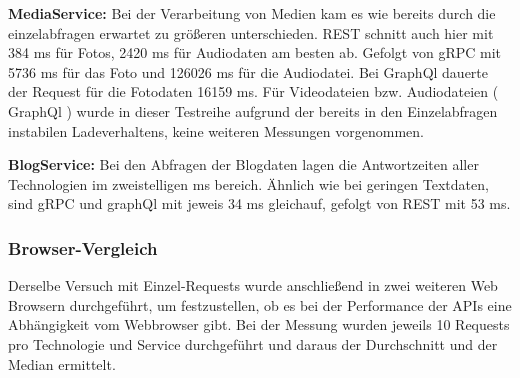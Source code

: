 \textbf{MediaService:}  
Bei der Verarbeitung von Medien kam es wie bereits durch die einzelabfragen erwartet zu größeren unterschieden. REST schnitt auch hier mit 384 ms für Fotos, 2420 ms für Audiodaten am besten ab. Gefolgt von gRPC mit 5736 ms für das Foto und 126026 ms für die Audiodatei. Bei GraphQl dauerte der Request für die Fotodaten 16159 ms.
Für Videodateien bzw. Audiodateien ( GraphQl ) wurde in dieser Testreihe aufgrund der bereits in den Einzelabfragen instabilen Ladeverhaltens, keine weiteren Messungen vorgenommen.


\textbf{BlogService:}  
Bei den Abfragen der Blogdaten lagen die Antwortzeiten aller Technologien im zweistelligen ms bereich. Ähnlich wie bei geringen Textdaten, sind gRPC und graphQl mit jeweis 34 ms gleichauf, gefolgt von REST mit 53 ms.

\clearpage
\subsubsection{Browser-Vergleich}
Derselbe Versuch mit Einzel-Requests wurde anschließend in zwei weiteren Web Browsern durchgeführt, um festzustellen, ob es bei der Performance der APIs eine Abhängigkeit vom Webbrowser gibt. 
Bei der Messung wurden jeweils 10 Requests pro Technologie und Service durchgeführt und daraus der Durchschnitt und der Median ermittelt.

